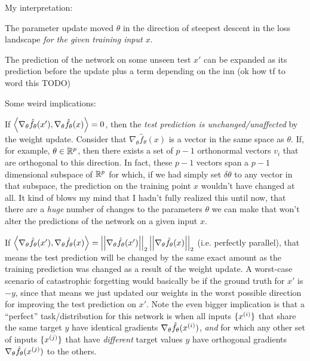 \documentclass[11pt]{article}
\begin{document}
\begin{tiny}
My interpretation:
\begin{compactenum}
	\item The parameter update moved $\theta$ in the direction of steepest descent in the loss landscape \textit{for the given training input $x$}. 
	
	\item The prediction of the network on some unseen test $x'$ can be expanded as its prediction before the update plus a term depending on the inn (ok how tf to word this TODO)
\end{compactenum}

Some weird implications:
\begin{compactitem}
	\item If $\left\langle \nabla_{\theta} \hat f_{\theta}(x')  ,  \nabla_{\theta} \hat f_{\theta}(x)  \right\rangle = 0$, then the \textit{test prediction is unchanged/unaffected} by the weight update. Consider that $\nabla_{\theta} \hat f_{\theta}(x)$ is a vector in the same space as $\theta$. If, for example, $\theta \in \mathbb{R}^p$, then there exists a set of $p-1$ orthonormal vectors $v_i$ that are orthogonal to this direction. In fact, these $p -1$ vectors span a $p-1$ dimensional subspace of $\mathbb{R}^p$ for which, if we had simply set $\delta \theta$ to any vector in that subspace, the prediction on the training point $x$ wouldn't have changed at all. It kind of blows my mind that I hadn't fully realized this until now, that there are a \textit{huge} number of changes to the parameters $\theta$ we can make that won't alter the predictions of the network on a given input $x$. 
	
	\item If $\left\langle \nabla_{\theta} \hat f_{\theta}(x')  ,  \nabla_{\theta} \hat f_{\theta}(x)  \right\rangle = \left|\left| \nabla_{\theta} \hat f_{\theta}(x') \right|\right|_{2} \left|\left| \nabla_{\theta} \hat f_{\theta}(x)  \right|\right|_{2}$ (i.e. perfectly parallel), that means the test prediction will be changed by the same exact amount as the training prediction was changed as a result of the weight update. A worst-case scenario of catastrophic forgetting would basically be if the ground truth for $x'$ is $-y$, since that means we just updated our weights in the worst possible direction for improving the test prediction on $x'$. Note the even bigger implication is that a ``perfect'' task/distribution for this network is when all inputs $\{\ival[i]{x} \}$ that share the same target $y$ have identical gradients $\nabla_{\theta} \hat f_{\theta}(\ival[i]{x})$, \textit{and} for which any other set of inputs $\{ \ival[j]{x} \}$ that have \textit{different} target values $y$ have orthogonal gradients $\nabla_{\theta} \hat f_{\theta}(\ival[j]{x})$ to the others. 
\end{compactitem}

\end{tiny}
\end{document}
